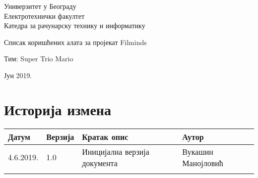 \documentclass[12pt,a4paper]{article}
\begin{document}
\begin{titlepage}
\begin{center}
  Универзитет у Београду \\
  Електротехнички факултет \\
  Катедра за рачунарску технику и информатику \\
  \vfill

  {\fontsize{50}{60}\selectfont Списак коришћених алата за пројекат Filminds}
  \vskip 0.6cm

  {\large Тим: Super Trio Mario}
  \vskip 0.3cm

  \vfill
  \vfill

  Јун 2019.
\hfill

\end{center}
\end{titlepage}

\section*{Историја измена}
\noindent
\setcellgapes{4pt}
\makegapedcells
\begin{tabularx}{\linewidth}{|l|l|X|X|}
    \hline
    \textbf{Датум} & \textbf{Верзија} & \textbf{Кратак опис} & \textbf{Аутор} \\
    \hline
    4.6.2019. & 1.0 & Иницијална верзија документа & Вукашин Манојловић \\
    \hline
    & & & \\
    \hline
\end{tabularx}
\newpage

\tableofcontents
\newpage



\end{document}
